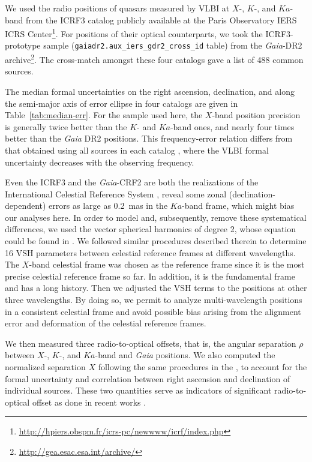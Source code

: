 \documentclass[referee]{aa}        %
\begin{document}
   We used the radio positions of quasars measured by VLBI at $X$-, $K$-, and $Ka$-band from the ICRF3 catalog publicly available at the Paris Observatory IERS ICRS Center\footnote{\url{http://hpiers.obspm.fr/icrs-pc/newwww/icrf/index.php}}.
   For positions of their optical counterparts, we took the ICRF3-prototype sample (\texttt{gaiadr2.aux\_iers\_gdr2\_cross\_id} table) from the \textit{Gaia}-DR2 archive\footnote{\url{http://gea.esac.esa.int/archive/}}.
   The cross-match amongst these four catalogs gave a list of 488 common sources.

   The median formal uncertainties on the right ascension, declination, and along the semi-major axis of error ellipse in four catalogs are given in Table~\ref{tab:median-err}.
   For the sample used here, the $X$-band position precision is generally twice better than the $K$- and $Ka$-band ones, and nearly four times better than the \textit{Gaia} DR2 positions.
   This frequency-error relation differs from that obtained using all sources in each catalog \citep{2020A&A...634A..28L},
   where the VLBI formal uncertainty decreases with the observing frequency.

   Even the ICRF3 and the \textit{Gaia}-CRF2 are both the realizations of the International Celestial Reference System \citep[ICRS;][]{1995A&A...303..604A,1998A&A...331L..33F}, \citet{2020A&A...634A..28L} reveal some zonal (declination-dependent) errors as large as 0.2~mas in the $Ka$-band frame, which might bias our analyses here.
   In order to model and, subsequently, remove these systematical differences, we used the vector spherical harmonics \citep[VSH;][]{2012A&A...547A..59M} of degree 2, whose equation could be found in \citet[][their Eq.~(1)]{2020A&A...634A..28L}.
   We followed similar procedures described therein to determine 16 VSH parameters between celestial reference frames at different wavelengths.
   The $X$-band celestial frame was chosen as the reference frame since it is the most precise celestial reference frame so far.
   In addition, it is the fundamental frame and has a long history.
   Then we adjusted the VSH terms to the positions at other three wavelengths.
   By doing so, we permit to analyze multi-wavelength positions in a consistent celestial frame and avoid possible bias arising from the alignment error and deformation of the celestial reference frames.

   We then measured three radio-to-optical offsets, that is, the angular separation $\rho$ between $X$-, $K$-, and $Ka$-band and \textit{Gaia} positions.
   We also computed the normalized separation $X$ following the same procedures in the \citet[][their X-statistics]{2016A&A...595A...5M},
   to account for the formal uncertainty and correlation between right ascension and declination of individual sources.
   These two quantities serve as indicators of significant radio-to-optical offset as done in recent works \citep[e.g.,][]{2019MNRAS.482.3023P,2018A&A...616A..14G}.
\end{document}
